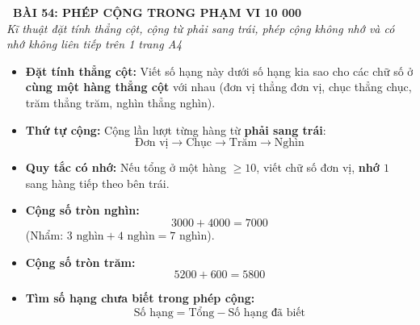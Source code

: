\documentclass[11pt,a4paper]{article}
\begin{document}
\begin{tcolorbox}[
  enhanced,
  colback=white,
  colframe=primary,
  arc=3mm,
  boxrule=1.2pt,
  left=4mm, right=4mm, top=2.5mm, bottom=2.5mm,
  drop shadow=black!10!white
]
  \centering
  {\Large\bfseries\color{primary}\faBookmark\ BÀI 54: PHÉP CỘNG TRONG PHẠM VI 10 000}\\[1.5mm]
  {\small\itshape\color{black!75}Kĩ thuật đặt tính thẳng cột, cộng từ phải sang trái, phép cộng không nhớ và có nhớ không liên tiếp trên 1 trang A4}
\end{tcolorbox}

\vspace{-2mm}


\noindent
\begin{minipage}[t]{0.49\textwidth}\vspace{0pt}
\begin{tcolorbox}[
  enhanced,
  colback=blue!4!white,
  colframe=blue!75!black,
  arc=2mm, boxrule=0.8pt,
  left=2mm, right=2mm, top=1.8mm, bottom=1.8mm,
  title={\footnotesize\bfseries\color{white}\faKey\ 1. Quy trình Đặt tính rồi tính}
]
{\footnotesize
\begin{itemize}\setlength{\itemsep}{1.5pt}\setlength{\leftskip}{-2.5mm}
  \item \textbf{Đặt tính thẳng cột:}
  Viết số hạng này dưới số hạng kia sao cho các chữ số ở \textbf{cùng một hàng thẳng cột} với nhau (đơn vị thẳng đơn vị, chục thẳng chục, trăm thẳng trăm, nghìn thẳng nghìn).
  \item \textbf{Thứ tự cộng:}
  Cộng lần lượt từng hàng từ \textbf{phải sang trái}:
  $$\text{Đơn vị} \to \text{Chục} \to \text{Trăm} \to \text{Nghìn}$$
  \item \textbf{Quy tắc có nhớ:} Nếu tổng ở một hàng $\ge 10$, viết chữ số đơn vị, \textbf{nhớ $1$} sang hàng tiếp theo bên trái.
\end{itemize}
}
\end{tcolorbox}
\end{minipage}
\hfill
\begin{minipage}[t]{0.49\textwidth}\vspace{0pt}
\begin{tcolorbox}[
  enhanced,
  colback=teal!4!white,
  colframe=teal!75!black,
  arc=2mm, boxrule=0.8pt,
  left=2mm, right=2mm, top=1.8mm, bottom=1.8mm,
  title={\footnotesize\bfseries\color{white}\faCalculator\ 2. Tính nhẩm các số tròn nghìn, tròn trăm}
]
{\footnotesize
\begin{itemize}\setlength{\itemsep}{1.5pt}\setlength{\leftskip}{-2.5mm}
  \item \textbf{Cộng số tròn nghìn:}
  $$3000 + 4000 = 7000$$
  (Nhẩm: $3\text{ nghìn} + 4\text{ nghìn} = 7\text{ nghìn}$).
  \item \textbf{Cộng số tròn trăm:}
  $$5200 + 600 = 5800$$
  \item \textbf{Tìm số hạng chưa biết trong phép cộng:}
  $$\text{Số hạng} = \text{Tổng} - \text{Số hạng đã biết}$$
\end{itemize}
}
\end{tcolorbox}
\end{minipage}
\end{document}
